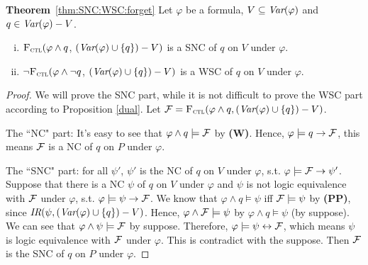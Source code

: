 \documentclass[letterpaper]{article} %
\begin{document}
\noindent\textbf{Theorem}~\ref{thm:SNC:WSC:forget} Let $\varphi$ be a formula, $V\subseteq\textit{Var}(\varphi)$ and $q\in\textit{Var}(\varphi)- V$.
 \begin{enumerate}[(i)]
   \item ${\textsc{F}_{\textsc{ctl}}} (\varphi \land q$, $(\textit{Var}(\varphi) \cup \{q\})- V)$
   is a SNC of $q$ on $V$ under $\varphi$.
   \item  $\neg{\textsc{F}_{\textsc{ctl}}} (\varphi \land \neg q$, $(\textit{Var}(\varphi) \cup \{q\})- V)$
   is a WSC of $q$ on $V$ under $\varphi$.
 \end{enumerate}
\begin{proof}
 We will prove the SNC part, while it is not difficult to prove the WSC part according to Proposition \ref{dual}.
 Let ${\cal F}={\textsc{F}_{\textsc{ctl}}}(\varphi \wedge q, (\textit{Var}(\varphi) \cup \{q\})- V)$.

   The ``NC" part: It's easy to see that $\varphi \wedge q \models {\cal F}$ by {\bfseries (W)}. Hence, $\varphi\models q \rightarrow {\cal F}$, this means
   ${\cal F}$ is a NC of $q$ on $P$ under $\varphi$.

    The ``SNC" part: for all $\psi'$, $\psi'$ is the NC of $q$ on $V$ under $\varphi$, s.t. $\varphi \models {\cal F} \rightarrow \psi'$.
    Suppose that there is a NC $\psi$ of $q$ on $V$ under $\varphi$ and $\psi$ is not logic equivalence with ${\cal F}$ under $\varphi$, s.t. $\varphi \models \psi \rightarrow {\cal F}$.
    We know that $\varphi \wedge q \models \psi$ iff ${\cal F} \models \psi$ by {\bfseries (PP)}, since $\emph{IR}(\psi, (\textit{Var}(\varphi) \cup \{q\})- V)$. Hence, $\varphi \wedge {\cal F} \models \psi$ by $\varphi \wedge q \models \psi$ (by suppose).
    We can see that $\varphi \wedge \psi \models {\cal F}$ by suppose. Therefore, $\varphi \models \psi \leftrightarrow {\cal F}$, which means $\psi$ is logic equivalence with ${\cal F}$ under $\varphi$.
    This is contradict with the suppose. Then ${\cal F}$ is the SNC of $q$ on $P$ under $\varphi$.
 \end{proof}
\end{document}
